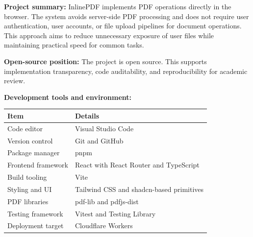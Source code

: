 \textbf{Project summary:} InlinePDF implements PDF operations directly in the browser. The system avoids server-side PDF processing and does not require user authentication, user accounts, or file upload pipelines for document operations. This approach aims to reduce unnecessary exposure of user files while maintaining practical speed for common tasks.

\textbf{Open-source position:} The project is open source. This supports implementation transparency, code auditability, and reproducibility for academic review.

\textbf{Development tools and environment:}
\begin{longtable}{p{}p{}}
\toprule
Item & Details \\
\midrule
Code editor & Visual Studio Code \\
Version control & Git and GitHub \\
Package manager & pnpm \\
Frontend framework & React with React Router and TypeScript \\
Build tooling & Vite \\
Styling and UI & Tailwind CSS and shadcn-based primitives \\
PDF libraries & pdf-lib and pdfjs-dist \\
Testing framework & Vitest and Testing Library \\
Deployment target & Cloudflare Workers \\
\bottomrule
\end{longtable}
